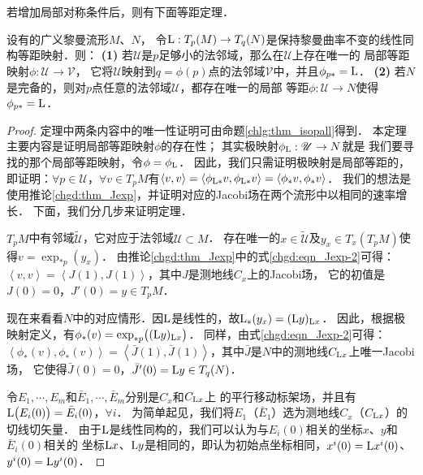 若增加{\kaishu 局部对称}条件后，则有下面等距定理．


\begin{theorem}\label{chhss:thm_cartan-isometry}
    设有的广义黎曼流形$M$、$N$，
    令${\rm L }:T_p(M)\to T_q(N)$是保持黎曼曲率不变的线性同构等距映射．则：    
    {\bfseries (1)}  若$\mathscr{U}$是$p$足够小的法邻域，那么在$\mathscr{U}$上存在唯一的
    局部等距映射$\phi:\mathscr{U}\to \mathscr{V}$，
    它将$\mathscr{U}$映射到$q=\phi(p)$点的法邻域$\mathscr{V}$中，并且$\phi_{p*} = {\rm L}$．    
    {\bfseries (2)} 若$N$是完备的，则对$p$点任意的法邻域$\mathscr{U}$，都存在唯一的局部
    等距$\phi:\mathscr{U}\to N$使得$\phi_{p*} = {\rm L}$．
\end{theorem}
\begin{proof}
    定理中两条内容中的{\kaishu 唯一性}证明可由命题\ref{chlg:thm_isopall}得到．
    本定理主要内容是证明局部等距映射$\phi$的存在性；
    其实极映射$\phi_{\rm L} : \mathscr{U}\to N$就是
    我们要寻找的那个局部等距映射，令$\phi=\phi_{\rm L}$．    
    因此，我们只需证明极映射是局部等距的，
    即证明：$\forall p\in \mathscr{U}$，$\forall v\in T_p M$有$\left<v,v\right>=
    \left<\phi_{{\rm L}*}v,\phi_{{\rm L}*}v\right>=\left<\phi_{*}v,\phi_{*}v\right>$．
    我们的想法是使用推论\ref{chgd:thm_Jexp}，并证明对应的Jacobi场在两个流形中以相同的速率增长．
    下面，我们分几步来证明定理．
    
     $T_pM$中有邻域$\widetilde{\mathscr{U}}$，它对应于法邻域$\mathscr{U}\subset M$．
    存在唯一的$x\in \widetilde{\mathscr{U}}$及$y_x \in T_x (T_pM)$使得$v=\exp_{*p}(y_x)$．
    由推论\ref{chgd:thm_Jexp}中的式\eqref{chgd:eqn_Jexp-2}可得：
    $\left<v,v\right>=\left<J(1),J(1)\right>$，其中$J$是测地线$C_x$上的Jacobi场，
    它的初值是$J(0)=0$，$J'(0)=y \in T_pM$．
    
     现在来看看$N$中的对应情形．因${\rm L}$是线性的，故${\rm L}_* (y_x) = ({\rm L} y)_{{\rm L}x}$．
    因此，根据极映射定义，有$\phi_{*} (v) = \exp_{*p}\bigl(({\rm L}y)_{{\rm L}x}\bigr)$．
    同样，由式\eqref{chgd:eqn_Jexp-2}可得：$\left<\phi_{*} (v),\phi_{*} (v)\right>
    =\left<\bar{J}(1),\bar{J}(1)\right>$，其中$\bar{J}$是$N$中的测地线$C_{{\rm L}x}$上唯一Jacobi场，
    它使得$\bar{J}(0)=0$，$\bar{J}'(0)={\rm L}y \in T_q(N)$．
    
     令$E_1,\cdots,E_m$和$\bar{E}_1,\cdots,\bar{E}_m$分别是$C_x$和$C_{{\rm L}x}$上
    的平行移动标架场，并且有${\rm L}\bigl(E_i(0)\bigr)= \bar{E}_i(0)$，$\forall i$．
    为简单起见，我们将$E_1$（$\bar{E}_1$）选为测地线$C_x$（$C_{{\rm L}x}$）的切线切矢量．
    由于$\rm L$是线性同构的，我们可以认为与$E_i(0)$相关的坐标$x$、$y$和$\bar{E}_i(0)$相关的
    坐标${\rm L}x$、${\rm L}y$是相同的，即认为初始点坐标相同，$x^i(0) = {\rm L}x^i(0)$、$y^i(0) = {\rm L}y^i(0)$．
    

\end{proof}
